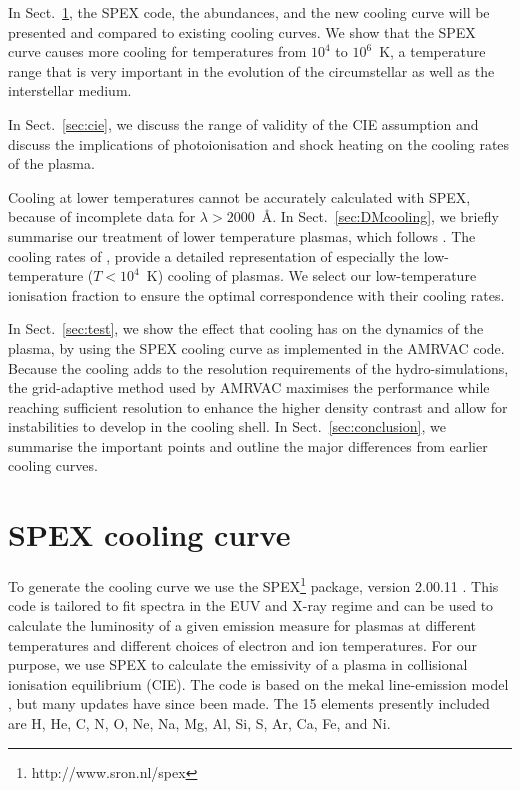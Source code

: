 \documentclass[floatfix,traditabstract,preprint2]{aa}
\begin{document}
In Sect.~\ref{sec:spex}, the SPEX code, the abundances, and the new cooling curve will be presented and compared to existing cooling curves. We show that the SPEX curve causes more cooling for temperatures from $10^4$ to $10^6$~K, a temperature range that is very important in the evolution of the circumstellar as well as the interstellar medium. 

In Sect.~\ref{sec:cie}, we discuss the range of validity of the CIE assumption and discuss the implications of photoionisation and shock heating on the cooling rates of the plasma.

Cooling at lower temperatures cannot be accurately calculated with SPEX, because of incomplete data for $\lambda>2000$~\AA. 
In Sect.~\ref{sec:DMcooling}, we briefly summarise our treatment of lower temperature plasmas, which follows \citet{1972DalgarnoMcCray}. The cooling rates of \citet{2008Smithetal}, provide a detailed representation of especially the low-temperature ($T <10^4$~K) cooling of plasmas. We select our low-temperature ionisation fraction to ensure the optimal correspondence with their cooling rates.


In Sect.~\ref{sec:test}, we show the effect that cooling has on the dynamics of the plasma, by using the SPEX cooling curve as implemented in the AMRVAC code. Because the cooling adds to the resolution requirements of the hydro-simulations, the grid-adaptive method used by AMRVAC maximises the performance while reaching sufficient resolution to enhance the higher density contrast and allow for instabilities to develop in the cooling shell. 
In Sect.~\ref{sec:conclusion}, we summarise the important points and outline the major differences from earlier cooling curves.
 


\section{SPEX cooling curve} 
\label{sec:spex}


To generate the cooling curve we use the {\sc SPEX}\footnote{http://www.sron.nl/spex} package, version 2.00.11 \citep{2000KaastraMewe}. This code is tailored to fit spectra in the EUV and X-ray regime and can be used to calculate the luminosity of a given emission measure for plasmas at different temperatures and different choices of electron and ion temperatures. For our purpose, we use SPEX to calculate the emissivity of a plasma in collisional ionisation equilibrium (CIE). The code is based on the mekal line-emission model \citep{1995Meweetal}, but many updates have since been made. The 15 elements presently included are H, He, C, N, O, Ne, Na, Mg, Al, Si, S, Ar, Ca, Fe, and Ni. 
\end{document}
